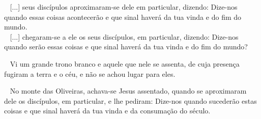 \documentclass[12pt,aspectratio=169]{beamer}
\newcommand{\ver}[1]{%
    \raisebox{0.50ex}{%
        \scalebox{1.1}{%
            \pmb{\textbf{\textcolor{BSpbg}{#1}}}%
        }%
    }%
}
\newcommand{\QUOTE}[1]{%
    \par\noindent\hspace*{0.1\linewidth}%
    \begin{minipage}{0.8\linewidth}%
        \linespread{1.35}\large{#1}%
    \end{minipage}%
}
\newcommand{\YEL}[1]{{\textcolor{TXyel}{#1}}}
\newcommand{\GRE}[1]{{\textcolor{TXgre}{#1}}}
\newcommand{\CYA}[1]{{\textcolor{TXcya}{#1}}}
\newcommand{\MAG}[1]{{\textcolor{TXmag}{#1}}}
\newcommand{\BRI}[1]{{\textcolor{BSpbg}{#1}}}   %
\begin{document}
    \begin{frame}
        \QUOTE{%
            \ver{(A21) Mt~24.3}~%
            [...] seus discípulos  aproximaram-se  dele  em  particular,  dizendo:  Dize-nos
            \YEL{quando essas coisas acontecerão} e \GRE{que sinal haverá da tua vinda} e do
            \MAG{fim do mundo}. \\[\bigskipamount]
            \ver{(ARC) Mt~24.3}~%
            [...] chegaram-se a ele os seus discípulos,  em  particular,  dizendo:  Dize-nos
            \YEL{quando serão essas coisas} e \GRE{que sinal  haverá  da  tua  vinda}  e  do
            \MAG{fim do mundo}?
        }
    \end{frame}

    \begin{frame}
        \QUOTE{%
            \ver{(ARA) Ap~20.11}~%
            Vi um grande trono branco e  aquele  que  nele  se  assenta,  de  cuja  presença
            \YEL{fugiram} a \GRE{terra} e o \CYA{céu}, e \MAG{não se achou lugar para eles}.
        }
    \end{frame}

    \begin{frame}
        \QUOTE{%
            \ver{(ARA) Mt~24.3}~%
            No monte das Oliveiras, achava-se Jesus assentado, quando se aproximaram dele os
            discípulos, \BRI{em particular}, e lhe pediram: Dize-nos  \YEL{quando  sucederão
            estas coisas} e \GRE{que sinal haverá da tua  vinda}  e  da  \MAG{consumação  do
            século}.
        }
    \end{frame}



\end{document}
